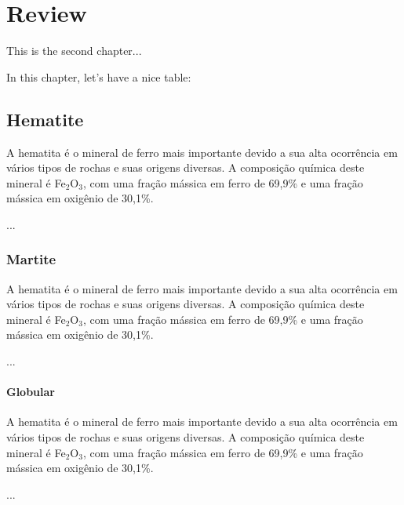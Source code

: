 
\chapter{Review}

This is the second chapter...

In this chapter, let's have a nice table:

%


\section{Hematite}

A hematita é o mineral de ferro mais importante devido a sua alta
ocorrência em vários tipos de rochas e suas origens diversas.\cite{30}
A composição química deste mineral é Fe$_{2}$O$_{3}$, com uma fração
mássica em ferro de 69,9\% e uma fração mássica em oxigênio de
30,1\%.\cite{31}

...


\subsection{Martite}

A hematita é o mineral de ferro mais importante devido a sua alta
ocorrência em vários tipos de rochas e suas origens diversas.\cite{30}
A composição química deste mineral é Fe$_{2}$O$_{3}$, com uma fração
mássica em ferro de 69,9\% e uma fração mássica em oxigênio de
30,1\%.\cite{31}

...


\subsubsection{Globular}

A hematita é o mineral de ferro mais importante devido a sua alta
ocorrência em vários tipos de rochas e suas origens diversas.\cite{30}
A composição química deste mineral é Fe$_{2}$O$_{3}$, com uma fração
mássica em ferro de 69,9\% e uma fração mássica em oxigênio de
30,1\%.\cite{31}

...
